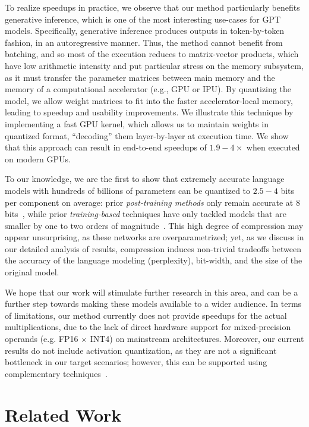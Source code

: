 To realize speedups in practice, we observe that our method particularly benefits generative inference, which is one of the most interesting use-cases for GPT models. Specifically, generative inference produces outputs in token-by-token fashion, in an autoregressive manner. Thus, the method cannot benefit from batching, and so most of the execution reduces to matrix-vector products, which have low arithmetic intensity and put particular stress on the memory subsystem, as it must transfer the parameter matrices between main memory and the memory of a computational accelerator (e.g., GPU or IPU). 
By quantizing the model, we allow weight matrices to fit into the faster accelerator-local memory, leading to speedup and usability improvements. 
We illustrate this technique by implementing a fast  GPU kernel, 
which allows us to maintain weights in quantized format, ``decoding'' them layer-by-layer at execution time. 
We show that this approach can result in end-to-end speedups of $1.9 - 4\times$ when executed on modern GPUs. 

To our knowledge, we are the first to show that extremely accurate language models with hundreds of billions of parameters can be quantized to $2.5 - 4$ bits per component on average: prior \emph{post-training methods} only remain accurate at 8 bits~\cite{yao2022zeroquant, dettmers2022llm}, while prior \emph{training-based} techniques have only tackled  models that are smaller by one to two orders of magnitude~\cite{wu2022extreme, tao2022compression}. This high degree of compression may appear unsurprising, as these networks are overparametrized; yet, as we discuss in our detailed analysis of results, compression induces non-trivial tradeoffs between the accuracy of the language modeling (perplexity), bit-width, and the size of the original model.

We hope that our work will stimulate further research in this area, and can be a further step towards making these models available to a wider audience. 
In terms of limitations, our method currently does not provide speedups for the actual multiplications, due to the lack of direct hardware support for mixed-precision operands (e.g. FP16 $\times$ INT4) on mainstream architectures. Moreover, our current results do not include activation quantization, as they are not a significant bottleneck in our target scenarios; however, this can be supported using complementary techniques~\cite{dettmers2022llm, yao2022zeroquant}. 

\section{Related Work}

